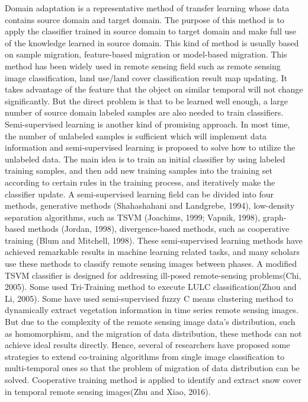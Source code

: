 \documentclass{isprs} %
\begin{document}
Domain adaptation is a representative method of transfer learning whose data contains source domain and target domain. The purpose of this method is to apply the classifier trained in source domain to target domain and make full use of the knowledge learned in source domain. This kind of method is usually based on sample migration, feature-based migration or model-based migration. This method has been widely used in remote sensing field such as remote sensing image classification, land use/land cover classification result map updating. It takes advantage of the feature that the object on similar temporal will not change significantly. But the direct problem is that to be learned well enough, a large number of source domain labeled samples are also needed to train classifiers.
Semi-supervised learning is another kind of promising approach. In most time, the number of unlabeled samples is sufficient which will implement data information and semi-supervised learning is proposed to solve how to utilize the unlabeled data. The main idea is to train an initial classifier by using labeled training samples, and then add new training samples into the training set according to certain rules in the training process, and iteratively make the classifier update. A semi-supervised learning field can be divided into four methods, generative methods (Shahashahani and Landgrebe, 1994), low-density separation algorithms, such as TSVM (Joachims, 1999; Vapnik, 1998), graph-based methods (Jordan, 1998), divergence-based methods, such as cooperative training (Blum and Mitchell, 1998). These semi-supervised learning methods have achieved remarkable results in machine learning related tasks, and many scholars use these methods to classify remote sensing images between phases. A modified TSVM classifier is designed for addressing ill-posed remote-sensing problems(Chi, 2005). Some used Tri-Training method to execute LULC classification(Zhou and Li, 2005). Some have used semi-supervised fuzzy C means clustering method to dynamically extract vegetation information in time series remote sensing images. But due to the complexity of the remote sensing image data’s distribution, such as homomorphism, and the migration of data distribution, these methods can not achieve ideal results directly. Hence, several of researchers have proposed some strategies to extend co-training algorithms from single image classification to multi-temporal ones so that the problem of migration of data distribution can be solved. Cooperative training method is applied to identify and extract snow cover in temporal remote sensing images(Zhu and Xiao, 2016).
\end{document}
